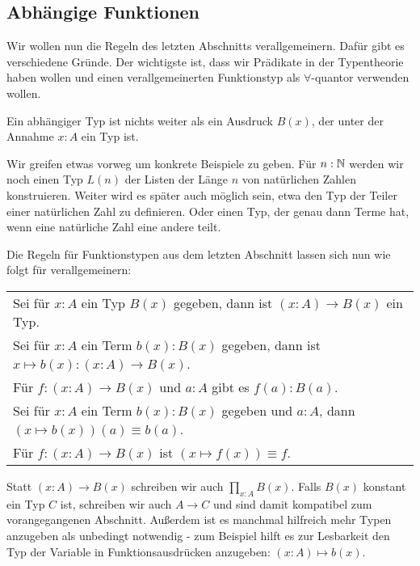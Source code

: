 \subsection{Abhängige Funktionen}
Wir wollen nun die Regeln des letzten Abschnitts verallgemeinern.
Dafür gibt es verschiedene Gründe. Der wichtigste ist, dass wir Prädikate in der Typentheorie haben wollen und einen verallgemeinerten Funktionstyp als $\forall$-quantor verwenden wollen.

Ein abhängiger Typ ist nichts weiter als ein Ausdruck $B(x)$, der unter der Annahme $x:A$ ein Typ ist.

\begin{beispiel}
  Wir greifen etwas vorweg um konkrete Beispiele zu geben.
  Für $n:\mathbb{N}$ werden wir noch einen Typ $L(n)$ der Listen der Länge $n$ von natürlichen Zahlen konstruieren. Weiter wird es später auch möglich sein, etwa den Typ der Teiler einer natürlichen Zahl zu definieren. Oder einen Typ, der genau dann Terme hat, wenn eine natürliche Zahl eine andere teilt.
\end{beispiel}

Die Regeln für Funktionstypen aus dem letzten Abschnitt lassen sich nun wie folgt für  verallgemeinern:

\begin{center}
\begin{tabular}{l}
  Sei für $x:A$ ein Typ $B(x)$ gegeben, dann ist $(x:A)\to B(x)$\index{$(x:A)\to B(x)$} ein Typ. \\
  Sei für $x:A$ ein Term $b(x):B(x)$ gegeben, dann ist $x\mapsto b(x) : (x:A)\to B(x)$\index{$x\mapsto b(x)$}. \\
  Für $f:(x:A)\to B(x)$ und $a:A$ gibt es $f(a):B(a)$. \\
  Sei für $x:A$ ein Term $b(x):B(x)$ gegeben und $a:A$, dann $(x\mapsto b(x))(a)\equiv b(a)$. \\
  Für $f:(x:A)\to B(x)$ ist $(x\mapsto f(x))\equiv f$.
\end{tabular}
\end{center}

Statt $(x:A)\to B(x)$ schreiben wir auch $\prod_{x:A}B(x)$.
Falls $B(x)$ konstant ein Typ $C$ ist, schreiben wir auch $A\to C$ und sind damit kompatibel zum vorangegangenen Abschnitt.
Außerdem ist es manchmal hilfreich mehr Typen anzugeben als unbedingt notwendig - zum Beispiel hilft es zur Lesbarkeit den Typ der Variable in Funktionsausdrücken anzugeben: $(x:A)\mapsto b(x)$.

